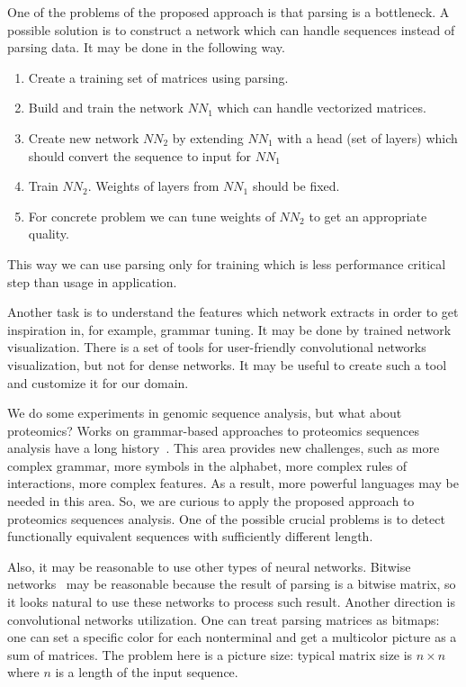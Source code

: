 \documentclass[a4paper,twoside]{article}
\begin{document}
One of the problems of the proposed approach is that parsing is a bottleneck.
A possible solution is to construct a network which can handle sequences instead of parsing data.
It may be done in the following way.
\begin{enumerate}
\item Create a training set of matrices using parsing.
\item Build and train the network $NN_1$ which can handle vectorized matrices.
\item Create new network $NN_2$ by extending $NN_1$ with a head (set of layers) which should convert the sequence to input for $NN_1$
\item Train $NN_2$. Weights of layers from $NN_1$ should be fixed.
\item For concrete problem we can tune weights of $NN_2$ to get an appropriate quality.
\end{enumerate}
This way we can use parsing only for training which is less performance critical step than usage in application.

Another task is to understand the features which network extracts in order to get inspiration in, for example, grammar tuning.
It may be done by trained network visualization.
There is a set of tools for user-friendly convolutional networks visualization, but not for dense networks.
It may be useful to create such a tool and customize it for our domain.

We do some experiments in genomic sequence analysis, but what about proteomics?
Works on grammar-based approaches to proteomics sequences analysis have a long history~\cite{Jimenez-Montano1984,Dyrka2008ASC,Sciacca2011AnnotatedSC}.
This area provides new challenges, such as more complex grammar, more symbols in the alphabet, more complex rules of interactions, more complex features.
As a result, more powerful languages may be needed in this area.
So, we are curious to apply the proposed approach to proteomics sequences analysis.
One of the possible crucial problems is to detect functionally equivalent sequences with sufficiently different length.

Also, it may be reasonable to use other types of neural networks.
Bitwise networks~\cite{DBLP:journals:corr:KimS16} may be reasonable because the result of parsing is a bitwise matrix, so it looks natural to use these networks to process such result. 
Another direction is convolutional networks utilization.
One can treat parsing matrices as bitmaps: one can set a specific color for each nonterminal and get a multicolor picture as a sum of matrices.
The problem here is a picture size: typical matrix size is $n \times n$ where $n$ is a length of the input sequence.
\end{document}
